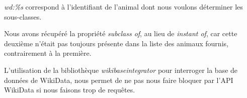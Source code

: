 \textit{{wd:\%s}} correspond à l'identifiant de l'animal dont nous voulons déterminer les sous-classes.

Nous avons récupéré la propriété \textit{subclass of}, au lieu de \textit{instant of}, car cette deuxième n'était pas toujours présente dans la liste des animaux fournis, contrairement à la première.

L'utilisation de la bibliothèque \textit{wikibaseintegrator} pour interroger la base de données de WikiData, nous permet de ne pas nous faire bloquer par l'API WikiData si nous faisons trop de requêtes.